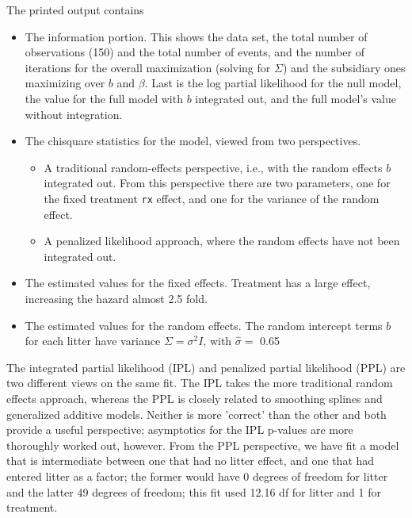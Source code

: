 \documentclass{article}
\begin{document}
The printed output contains
\begin{itemize}
  \item The information portion. This shows the data set, the total number
    of observations (150) and the total number of events, and the number
    of iterations for the overall maximization (solving for $\Sigma$) and
    the subsidiary ones maximizing over $b$ and $\beta$.  Last is the
    log partial likelihood for the null model, the value for the full
    model with $b$ integrated out, and the full model's value without
    integration.
  \item The chisquare statistics for the model, viewed from two perspectives.
    \begin{itemize}
      \item A traditional random-effects perspective, i.e., with the
        random effects $b$ integrated out.  From this perspective there are
        two parameters, one for the fixed treatment \texttt{rx} effect, and one for
        the variance of the random effect.
      \item A penalized likelihood approach, where the random effects have not
        been integrated out. 
    \end{itemize}
  \item The estimated values for the fixed effects.  Treatment has a
    large effect, increasing the hazard almost 2.5 fold.
  \item The estimated values for the random effects.  The random intercept terms
    $b$ for each litter have variance $\Sigma = \sigma^2 I$, with
    $\hat\sigma = $ 0.65
\end{itemize}

The integrated partial likelihood (IPL) and penalized partial likelihood (PPL)
are two different views on the same fit.  The IPL takes the more traditional
random effects approach, whereas the PPL is closely related to smoothing
splines and generalized additive models.  Neither is more 'correct' than the
other and both provide a useful perspective; asymptotics for the IPL p-values
are more thoroughly worked out, however.  
From the PPL perspective, we have fit a model that is intermediate between one
that had no litter effect, and one that had entered litter as a factor; the
former would have 0 degrees of freedom for litter and the latter 49 degrees
of freedom; this fit used 12.16 df for litter and 1 for treatment.
\end{document}
